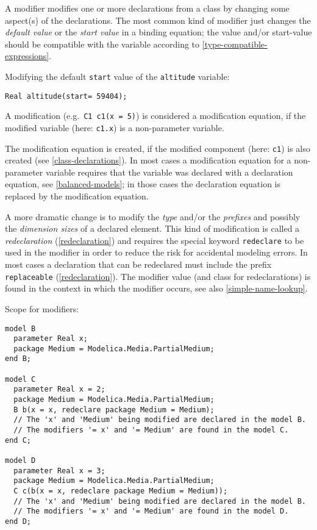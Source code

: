 A modifier modifies one or more declarations from a class by changing
some aspect(s) of the declarations. The most common kind of modifier
just changes the \emph{default value} or the \emph{start value} in a
binding equation; the value and/or start-value should be compatible with
the variable according to \cref{type-compatible-expressions}.

\begin{example}
Modifying the default \lstinline!start! value of the \lstinline!altitude! variable:
\begin{lstlisting}[language=modelica]
Real altitude(start= 59404);
\end{lstlisting}
\end{example}

A modification (e.g.\ \lstinline!C1 c1(x = 5)!) is considered a modification equation,
if the modified variable (here: \lstinline!c1.x!) is a non-parameter variable.

\begin{nonnormative}
The modification equation is created, if the modified component (here: \lstinline!c1!) is also created (see \cref{class-declarations}). In most cases
a modification equation for a non-parameter variable requires that the variable was declared with a declaration equation, see \cref{balanced-models};
in those cases the declaration equation is replaced by the modification equation.
\end{nonnormative}

A more dramatic change is to modify the \emph{type} and/or the
\emph{prefixes} and possibly the \emph{dimension sizes} of a declared
element. This kind of modification is called a \emph{redeclaration}
(\cref{redeclaration}) and requires the special keyword \lstinline!redeclare! to be used in
the modifier in order to reduce the risk for accidental modeling errors.
In most cases a declaration that can be redeclared must include the
prefix \lstinline!replaceable! (\cref{redeclaration}). The modifier value (and class for
redeclarations) is found in the context in which the modifier occurs,
see also \cref{simple-name-lookup}.

\begin{example}
Scope for modifiers:
\begin{lstlisting}[language=modelica]
model B
  parameter Real x;
  package Medium = Modelica.Media.PartialMedium;
end B;

model C
  parameter Real x = 2;
  package Medium = Modelica.Media.PartialMedium;
  B b(x = x, redeclare package Medium = Medium);
  // The 'x' and 'Medium' being modified are declared in the model B.
  // The modifiers '= x' and '= Medium' are found in the model C.
end C;

model D
  parameter Real x = 3;
  package Medium = Modelica.Media.PartialMedium;
  C c(b(x = x, redeclare package Medium = Medium));
  // The 'x' and 'Medium' being modified are declared in the model B.
  // The modifiers '= x' and '= Medium' are found in the model D.
end D;
\end{lstlisting}
\end{example}

